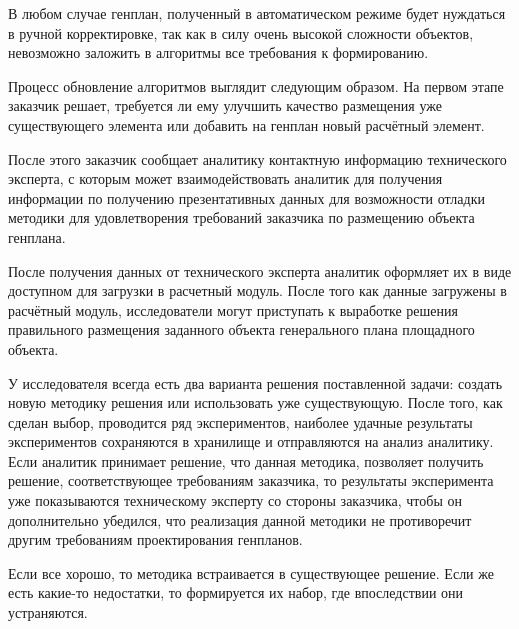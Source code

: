 В любом случае генплан, полученный в автоматическом режиме будет нуждаться в ручной корректировке,
так как в силу очень высокой сложности объектов, невозможно заложить в алгоритмы все требования к формированию.

Процесс обновление алгоритмов выглядит следующим образом.
На первом этапе заказчик решает, требуется ли ему улучшить качество размещения уже существующего элемента
или добавить на генплан новый расчётный элемент.

После этого заказчик сообщает аналитику контактную информацию технического эксперта, с которым может взаимодействовать
аналитик для получения информации по получению презентативных данных для возможности отладки методики
для удовлетворения требований заказчика по размещению объекта генплана.

После получения данных от технического эксперта аналитик оформляет их в виде доступном для загрузки в расчетный модуль.
После того как данные загружены в расчётный модуль, исследователи могут приступать к выработке решения
правильного размещения заданного объекта генерального плана площадного объекта.

У исследователя всегда есть два варианта решения поставленной задачи: создать новую методику решения
или использовать уже существующую.
После того, как сделан выбор, проводится ряд экспериментов,
наиболее удачные результаты экспериментов сохраняются в хранилище и отправляются на анализ аналитику.
Если аналитик принимает решение, что данная методика, позволяет получить решение, соответствующее требованиям
заказчика, то результаты эксперимента уже показываются техническому эксперту со стороны заказчика,
чтобы он дополнительно убедился, что реализация данной методики не противоречит другим требованиям
проектирования генпланов.

Если все хорошо, то методика встраивается в существующее решение. Если же есть какие-то недостатки, то формируется
их набор, где впоследствии они устраняются.
